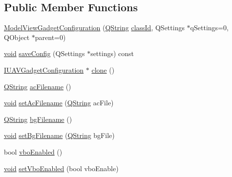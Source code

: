 \subsection*{\-Public \-Member \-Functions}
\begin{DoxyCompactItemize}
\item 
\hyperlink{group___model_view_plugin_ga68c5b45bcb3a5b4f35186957e765e343}{\-Model\-View\-Gadget\-Configuration} (\hyperlink{group___u_a_v_objects_plugin_gab9d252f49c333c94a72f97ce3105a32d}{\-Q\-String} \hyperlink{group___core_plugin_gac953657221ba7fda967ada0408332641}{class\-Id}, \-Q\-Settings $\ast$q\-Settings=0, \-Q\-Object $\ast$parent=0)
\item 
\hyperlink{group___u_a_v_objects_plugin_ga444cf2ff3f0ecbe028adce838d373f5c}{void} \hyperlink{group___model_view_plugin_gaa2ed9dd347aecb4518cf716e3fbd9288}{save\-Config} (\-Q\-Settings $\ast$settings) const 
\item 
\hyperlink{group___core_plugin_gacdfdf0b1e39b5002472b76b6564ce51f}{\-I\-U\-A\-V\-Gadget\-Configuration} $\ast$ \hyperlink{group___model_view_plugin_gafe85c40e0602f4bb0a8f54637fd87b2c}{clone} ()
\item 
\hyperlink{group___u_a_v_objects_plugin_gab9d252f49c333c94a72f97ce3105a32d}{\-Q\-String} \hyperlink{group___model_view_plugin_ga38f0d11e16e59ffff87290b2a222468e}{ac\-Filename} ()
\item 
\hyperlink{group___u_a_v_objects_plugin_ga444cf2ff3f0ecbe028adce838d373f5c}{void} \hyperlink{group___model_view_plugin_ga5a6c75e6ec1963b48ad4cd6fd1f80e67}{set\-Ac\-Filename} (\hyperlink{group___u_a_v_objects_plugin_gab9d252f49c333c94a72f97ce3105a32d}{\-Q\-String} ac\-File)
\item 
\hyperlink{group___u_a_v_objects_plugin_gab9d252f49c333c94a72f97ce3105a32d}{\-Q\-String} \hyperlink{group___model_view_plugin_ga1d269e09831fb3fd6187c831b3b516b1}{bg\-Filename} ()
\item 
\hyperlink{group___u_a_v_objects_plugin_ga444cf2ff3f0ecbe028adce838d373f5c}{void} \hyperlink{group___model_view_plugin_gac9bccdbb077005f2bb94cfc7c9dfefaa}{set\-Bg\-Filename} (\hyperlink{group___u_a_v_objects_plugin_gab9d252f49c333c94a72f97ce3105a32d}{\-Q\-String} bg\-File)
\item 
bool \hyperlink{group___model_view_plugin_ga82f3e4d2137def4ff8aa56abc69d3bce}{vbo\-Enabled} ()
\item 
\hyperlink{group___u_a_v_objects_plugin_ga444cf2ff3f0ecbe028adce838d373f5c}{void} \hyperlink{group___model_view_plugin_gad35eb4d4a2a27f015e4e54b18e3b2b97}{set\-Vbo\-Enabled} (bool vbo\-Enable)
\end{DoxyCompactItemize}


